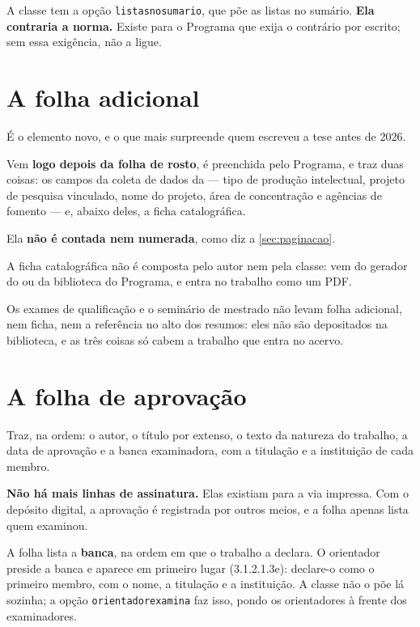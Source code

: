 \documentclass[dsc]{ufrj}
\begin{document}
  A classe tem a opção \texttt{listasnosumario}, que põe as listas no sumário.
  \textbf{Ela contraria a norma.} Existe para o Programa que exija o
  contrário por escrito; sem essa exigência, não a ligue.

  \section{A folha adicional}

  É o elemento novo, e o que mais surpreende quem escreveu a tese antes de 2026.

  Vem \textbf{logo depois da folha de rosto}, é preenchida pelo Programa, e traz
  duas coisas: os campos da coleta de dados da  --- tipo de produção
  intelectual, projeto de pesquisa vinculado, nome do projeto, área de
  concentração e agências de fomento --- e, abaixo deles, a ficha catalográfica.

  Ela \textbf{não é contada nem numerada}, como diz a \autoref{sec:paginacao}.

  A ficha catalográfica não é composta pelo autor nem pela classe: vem do gerador
  do  ou da biblioteca do Programa, e entra no trabalho como um PDF.

  Os exames de qualificação e o seminário de mestrado não levam folha adicional,
  nem ficha, nem a referência no alto dos resumos: eles não são depositados na
  biblioteca, e as três coisas só cabem a trabalho que entra no acervo.

  \section{A folha de aprovação}

  Traz, na ordem: o autor, o título por extenso, o texto da natureza do trabalho,
  a data de aprovação e a banca examinadora, com a titulação e a instituição de
  cada membro.

  \textbf{Não há mais linhas de assinatura.} Elas existiam para a via impressa.
  Com o depósito digital, a aprovação é registrada por outros meios, e a folha
  apenas lista quem examinou.

  A folha lista a \textbf{banca}, na ordem em que o trabalho a declara. O
  orientador preside a banca e aparece em primeiro lugar (3.1.2.1.3e): declare-o
  como o primeiro membro, com o nome, a titulação e a instituição. A classe não o
  põe lá sozinha; a opção \verb|orientadorexamina| faz isso, pondo os
  orientadores à frente dos examinadores.
\end{document}
